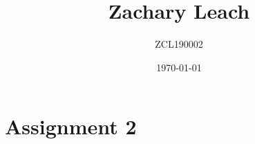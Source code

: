 \documentclass[twoside,12pt,a4paper,english]{memoir}
\title{Zachary Leach}
\author{ZCL190002}
\date{\today}
\begin{document}
\chapter{Assignment 2}
 



 

\end{document}
